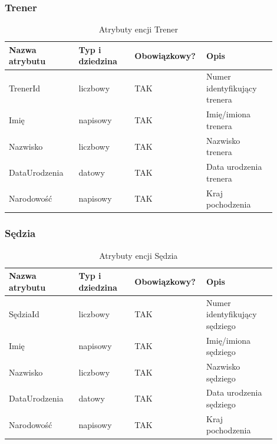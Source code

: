 \documentclass{mwrep}[15pt]
\begin{document}
\newpage

\subsubsection{Trener}
\begin{table}[H]
	\begin{tabular}{|p{0.25\linewidth}|p{0.2\linewidth}|p{0.2\linewidth}|p{0.25\linewidth}|}
	\hline
	Nazwa atrybutu & Typ i dziedzina & Obowiązkowy? & Opis                                                           \\ \hline
	TrenerId   & liczbowy                            & TAK                              & Numer identyfikujący trenera                                                   \\ \hline
	Imię         & napisowy                           & TAK                              & Imię/imiona trenera        \\ \hline
	Nazwisko	   & liczbowy							& TAK								& Nazwisko trenera \\  \hline
	DataUrodzenia          & datowy                           & TAK                              & Data urodzenia trenera              \\ \hline
	Narodowość           & napisowy                            & TAK                              & Kraj pochodzenia   \\ \hline
	\end{tabular}
	\caption{Atrybuty encji Trener}
\end{table}

\vspace{1cm}

\subsubsection{Sędzia}
\begin{table}[H]
	\begin{tabular}{|p{0.25\linewidth}|p{0.2\linewidth}|p{0.2\linewidth}|p{0.25\linewidth}|}
	\hline
	Nazwa atrybutu & Typ i dziedzina & Obowiązkowy? & Opis                                                           \\ \hline
	SędziaId   & liczbowy                            & TAK                              & Numer identyfikujący sędziego                                                   \\ \hline
	Imię         & napisowy                           & TAK                              & Imię/imiona sędziego        \\ \hline
	Nazwisko	   & liczbowy							& TAK								& Nazwisko sędziego \\  \hline
	DataUrodzenia          & datowy                           & TAK                              & Data urodzenia sędziego              \\ \hline
	Narodowość           & napisowy                            & TAK                              & Kraj pochodzenia   \\ \hline
	\end{tabular}
	\caption{Atrybuty encji Sędzia}
\end{table}
\end{document}
